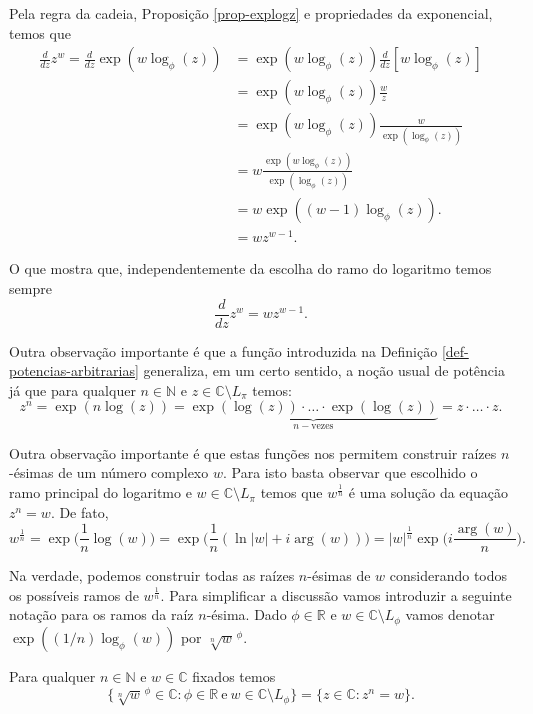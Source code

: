 Pela regra da cadeia,
Proposição \ref{prop-explogz} e propriedades da exponencial, temos que
\begin{align*}
\frac{d}{dz}z^w 
= 
\frac{d}{dz}\exp(w\log_{\phi}(z)) 
&=
\exp(w\log_{\phi}(z))\frac{d}{dz}[w\log_{\phi}(z)]
\\
&=
\exp(w\log_{\phi}(z))\frac{w}{z}
\\
&=
\exp(w\log_{\phi}(z))\frac{w}{\exp(\log_{\phi}(z))}
\\
&=
w\frac{\exp(w\log_{\phi}(z))}{\exp(\log_{\phi}(z))}
\\
&=
w \exp((w-1)\log_{\phi}(z)).
\\
&=
wz^{w-1}.
\end{align*}

O que mostra que, independentemente da escolha do ramo do logaritmo temos sempre 
\[
\frac{d}{dz}z^w = wz^{w-1}.
\]

Outra observação importante é que a função introduzida na 
Definição \ref{def-potencias-arbitrarias} generaliza, em um certo sentido, 
a noção usual de potência já que para qualquer $n\in\mathbb{N}$ e 
$z\in \mathbb{C}\setminus L_{\pi}$ temos: 
\[
z^n  
=  
\exp(n\log(z))
=
\underbrace{\exp(\log(z))\cdot\ldots\cdot\exp(\log(z))}_{n-\mathrm{vezes}}
= z\cdot\ldots\cdot z.
\]

Outra observação importante é que estas funções nos permitem construir raízes 
$n$-ésimas de um número complexo $w$. Para isto basta observar que 
escolhido o ramo principal do logaritmo e
$w\in \mathbb{C}\setminus L_{\pi}$ temos que $w^{\frac{1}{n}}$ é uma
solução da equação $z^n=w$. De fato, 
\[
w^{\frac{1}{n}}
=
\exp\Big(\frac{1}{n}\log(w)\Big)
=
\exp\Big(\frac{1}{n}(\ln|w|+i\arg(w))\Big)
=
|w|^{\frac{1}{n}}\exp\Big(i\frac{\arg(w)}{n}\Big).
\]


Na verdade, podemos construir todas as raízes $n$-ésimas de $w$
considerando todos os possíveis ramos de $w^{\frac{1}{n}}$.
Para simplificar a discussão vamos introduzir a seguinte notação para os
ramos da raíz $n$-ésima. 
Dado $\phi\in\mathbb{R}$ e $w\in \mathbb{C}\setminus L_{\phi}$
vamos denotar $\exp((1/n)\log_{\phi}(w))$ por $\sqrt[n]{w}^{\,\phi}$.
\begin{proposicao}\label{prop-ramos-raizes-raizes-nesimas}
Para qualquer $n\in\mathbb{N}$ e $w\in\mathbb{C}$ fixados temos 
\[
\{ \sqrt[n]{w}^{\,\phi} \in \mathbb{C}: \phi\in\mathbb{R}\ \text{e}\ w\in 
\mathbb{C}\setminus L_{\phi} \}
=
\{ z\in\mathbb{C}: z^n=w\}.
\]
\end{proposicao}

